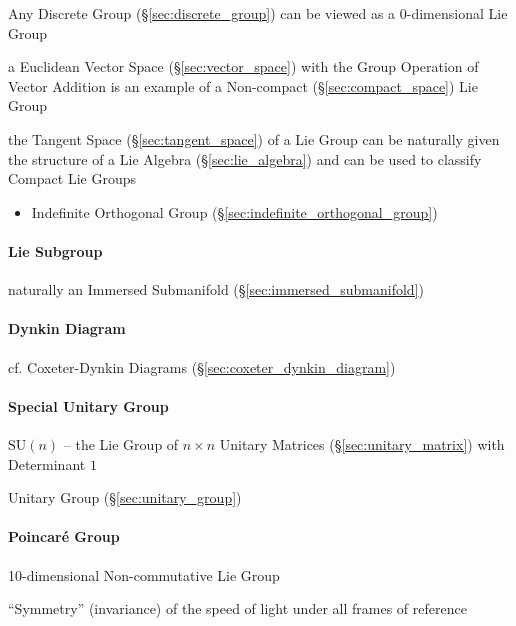 Any Discrete Group (\S\ref{sec:discrete_group}) can be viewed as a
$0$-dimensional Lie Group %

a Euclidean Vector Space (\S\ref{sec:vector_space}) with the Group Operation of
Vector Addition is an example of a Non-compact (\S\ref{sec:compact_space}) Lie
Group

the Tangent Space (\S\ref{sec:tangent_space}) of a Lie Group can be naturally
given the structure of a Lie Algebra (\S\ref{sec:lie_algebra}) and can be used
to classify Compact Lie Groups

\begin{itemize}
  \item Indefinite Orthogonal Group (\S\ref{sec:indefinite_orthogonal_group})
\end{itemize}



\paragraph{Lie Subgroup}\label{sec:lie_subgroup}\hfill

naturally an Immersed Submanifold (\S\ref{sec:immersed_submanifold})



\paragraph{Dynkin Diagram}\label{sec:dynkin_diagram}\hfill

cf. Coxeter-Dynkin Diagrams (\S\ref{sec:coxeter_dynkin_diagram})



\paragraph{Special Unitary Group}\label{sec:special_unitary}\hfill

$\mathrm{SU}(n)$ -- the Lie Group of $n \times n$ Unitary Matrices
(\S\ref{sec:unitary_matrix}) with Determinant $1$

Unitary Group (\S\ref{sec:unitary_group})



\paragraph{Poincar\'e Group}\label{sec:poincare_group}\hfill

10-dimensional Non-commutative Lie Group

``Symmetry'' (invariance) of the speed of light under all frames of reference



